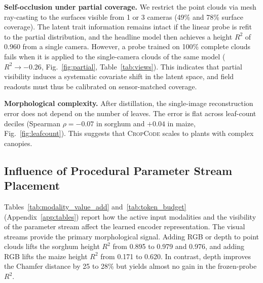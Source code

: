 \documentclass[10pt,twocolumn,letterpaper]{article}
\newcommand{\method}{\textsc{CropCode}}
\begin{document}
\noindent\textbf{Self-occlusion under partial coverage.}
We restrict the point clouds via mesh ray-casting to the surfaces visible from 1 or 3 cameras (49\% and 78\% surface coverage). The latent trait information remains intact if the linear probe is refit to the partial distribution, and the headline model then achieves a height $R^2$ of 0.960 from a single camera. However, a probe trained on 100\% complete clouds fails when it is applied to the single-camera clouds of the same model ($R^2 \to -0.26$, Fig.~\ref{fig:partial}, Table~\ref{tab:views}). This indicates that partial visibility induces a systematic covariate shift in the latent space, and field readouts must thus be calibrated on sensor-matched coverage.

\noindent\textbf{Morphological complexity.}
After distillation, the single-image reconstruction error does not depend on the number of leaves. The error is flat across leaf-count deciles (Spearman $\rho = -0.07$ in sorghum and $+0.04$ in maize, Fig.~\ref{fig:leafcount}). This suggests that \method{} scales to plants with complex canopies.

\subsection{Influence of Procedural Parameter Stream Placement}
\label{sec:param-stream}\label{sec:exp-params}

Tables~\ref{tab:modality_value_add} and~\ref{tab:token_budget} (Appendix~\ref{app:tables}) report how the active input modalities and the visibility of the parameter stream affect the learned encoder representation. The visual streams provide the primary morphological signal. Adding RGB or depth to point clouds lifts the sorghum height $R^2$ from 0.895 to 0.979 and 0.976, and adding RGB lifts the maize height $R^2$ from 0.171 to 0.620. In contrast, depth improves the Chamfer distance by 25 to 28\% but yields almost no gain in the frozen-probe $R^2$.
\end{document}
